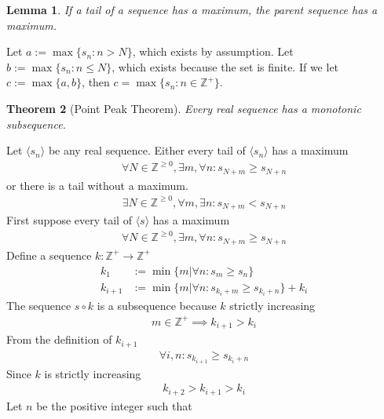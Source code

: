 \documentclass{amsart}
\numberwithin{equation}{section}
\let\oldendproof\endproof
\renewenvironment{proof}[1][\proofname]{%
  \setcounter{case}{0}
  \setcounter{step}{0}
  \oldproof[#1]%
}{\oldendproof}
\theoremstyle{plain}
\newtheorem{theorem}{Theorem}[section]
\newtheorem{lemma}[theorem]{Lemma}
\theoremstyle{definition}
\theoremstyle{remark}
\begin{document}
\begin{lemma}\label{Lemma:PointPeak}
  If a tail of a sequence has a maximum, the parent sequence has a maximum.
\end{lemma}
\begin{proof}
  Let $a:= \max \{s_n:n>N\}$, which exists by assumption.
  Let $b:= \max \{s_n:n\leq N\}$, which exists because the set is finite.
  If we let $c:= \max\{a,b\}$, then $c=\max\{s_n: n\in\mathbb{Z}^+\}$.
\end{proof}

\begin{theorem}[Point Peak Theorem]
  Every real sequence has a monotonic subsequence.
\end{theorem}
\begin{proof}
  Let $\langle s_n\rangle$ be any real sequence. Either every tail of $\langle s_n\rangle$ has a maximum
  \begin{align}
    \forall N\in\mathbb{Z}^{\geq 0},\exists m, \forall n: s_{N+m} \geq s_{N+n}
  \end{align}
  or there is a tail without a maximum.
  \begin{align}
    \exists N\in\mathbb{Z}^{\geq 0}, \forall m, \exists n: s_{N+m} < s_{N+n}
  \end{align}
  First suppose every tail of $\langle s\rangle$ has a maximum
  \begin{align}
    \forall N\in\mathbb{Z}^{\geq 0},\exists m, \forall n: s_{N+m} \geq s_{N+n}\nonumber
  \end{align}
  Define a sequence $k:\mathbb{Z}^+ \to \mathbb{Z}^+$
  \begin{align}
    k_1 &:= \min \{ m| \forall n: s_m \geq s_n\}\\
    k_{i+1} &:= \min \{ m | \forall n: s_{k_i+m} \geq s_{k_i+n} \} + k_i
  \end{align}
  The sequence $s\circ k$ is a subsequence because $k$ strictly increasing
  \begin{align}
    m \in \mathbb{Z}^+ \implies k_{i+1} > k_i
  \end{align}
  From the definition of $k_{i+1}$
  \begin{align}
    \forall i,n: s_{k_{i+1}} \geq s_{k_i+n}
  \end{align}
  Since $k$ is strictly increasing
  \begin{align}
    k_{i+2} > k_{i+1} > k_i
  \end{align}
  Let $n$ be the positive integer such that

\end{proof}
\end{document}
